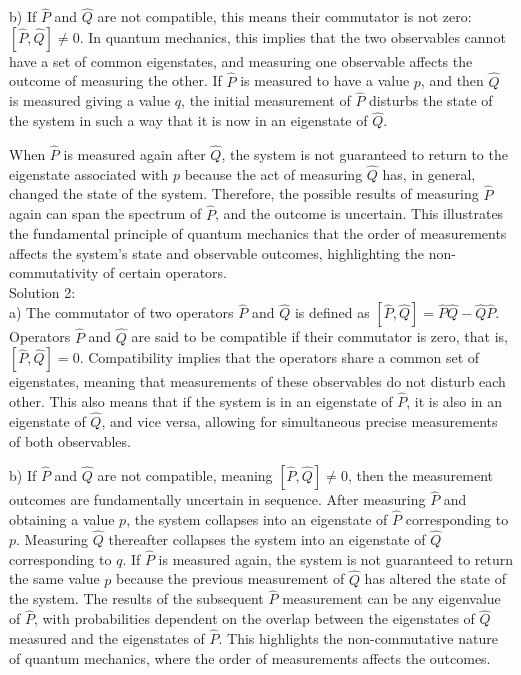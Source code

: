 \documentclass[a4paper,11pt]{article}
\begin{document}
b) If \( \hat{P} \) and \( \hat{Q} \) are not compatible, this means their commutator is not zero: \([ \hat{P}, \hat{Q} ] \neq 0\). In quantum mechanics, this implies that the two observables cannot have a set of common eigenstates, and measuring one observable affects the outcome of measuring the other. If \( \hat{P} \) is measured to have a value \( p \), and then \( \hat{Q} \) is measured giving a value \( q \), the initial measurement of \( \hat{P} \) disturbs the state of the system in such a way that it is now in an eigenstate of \( \hat{Q} \).

When \( \hat{P} \) is measured again after \( \hat{Q} \), the system is not guaranteed to return to the eigenstate associated with \( p \) because the act of measuring \( \hat{Q} \) has, in general, changed the state of the system. Therefore, the possible results of measuring \( \hat{P} \) again can span the spectrum of \( \hat{P} \), and the outcome is uncertain. This illustrates the fundamental principle of quantum mechanics that the order of measurements affects the system's state and observable outcomes, highlighting the non-commutativity of certain operators. \\

Solution 2: \\

a) The commutator of two operators \( \hat{P} \) and \( \hat{Q} \) is defined as \([ \hat{P}, \hat{Q} ] = \hat{P}\hat{Q} - \hat{Q}\hat{P}\). Operators \( \hat{P} \) and \( \hat{Q} \) are said to be compatible if their commutator is zero, that is, \([ \hat{P}, \hat{Q} ] = 0\). Compatibility implies that the operators share a common set of eigenstates, meaning that measurements of these observables do not disturb each other. This also means that if the system is in an eigenstate of \( \hat{P} \), it is also in an eigenstate of \( \hat{Q} \), and vice versa, allowing for simultaneous precise measurements of both observables.

b) If \( \hat{P} \) and \( \hat{Q} \) are not compatible, meaning \([ \hat{P}, \hat{Q} ] \neq 0\), then the measurement outcomes are fundamentally uncertain in sequence. After measuring \( \hat{P} \) and obtaining a value \( p \), the system collapses into an eigenstate of \( \hat{P} \) corresponding to \( p \). Measuring \( \hat{Q} \) thereafter collapses the system into an eigenstate of \( \hat{Q} \) corresponding to \( q \). If \( \hat{P} \) is measured again, the system is not guaranteed to return the same value \( p \) because the previous measurement of \( \hat{Q} \) has altered the state of the system. The results of the subsequent \( \hat{P} \) measurement can be any eigenvalue of \( \hat{P} \), with probabilities dependent on the overlap between the eigenstates of \( \hat{Q} \) measured and the eigenstates of \( \hat{P} \). This highlights the non-commutative nature of quantum mechanics, where the order of measurements affects the outcomes. \\
\end{document}
